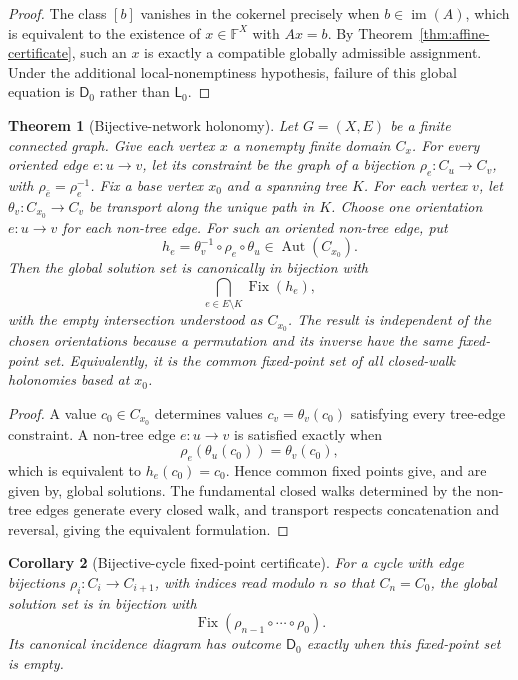 \documentclass[11pt]{article}
\theoremstyle{plain}
\newtheorem{theorem}{Theorem}[section]
\newtheorem{corollary}[theorem]{Corollary}
\theoremstyle{definition}
\theoremstyle{remark}
\begin{document}
\begin{proof}
The class $[b]$ vanishes in the cokernel precisely when
$b\in\operatorname{im}(A)$, which is equivalent to the existence of
$x\in\mathbb F^X$ with $Ax=b$. By Theorem~\ref{thm:affine-certificate}, such an
$x$ is exactly a compatible globally admissible assignment. Under the additional
local-nonemptiness hypothesis, failure of this global equation is
$\mathsf D_0$ rather than $\mathsf L_0$.
\end{proof}

\begin{theorem}[Bijective-network holonomy]
\label{thm:network-holonomy}
Let $G=(X,E)$ be a finite connected graph. Give each vertex $x$ a nonempty
finite domain $C_x$. For every oriented edge $e:u\to v$, let its constraint be
the graph of a bijection $\rho_e:C_u\to C_v$, with
$\rho_{\bar e}=\rho_e^{-1}$. Fix a base vertex $x_0$ and a spanning tree $K$.
For each vertex $v$, let $\theta_v:C_{x_0}\to C_v$ be transport along the
unique path in $K$. Choose one orientation $e:u\to v$ for each non-tree edge. For such an oriented
non-tree edge, put
\[
h_e=\theta_v^{-1}\circ\rho_e\circ\theta_u
\in\operatorname{Aut}(C_{x_0}).
\]
Then the global solution set is canonically in bijection with
\[
\bigcap_{e\in E\setminus K}\operatorname{Fix}(h_e),
\]
with the empty intersection understood as $C_{x_0}$. The result is independent
of the chosen orientations because a permutation and its inverse have the same
fixed-point set. Equivalently, it is the common fixed-point set of all
closed-walk holonomies
based at $x_0$.
\end{theorem}

\begin{proof}
A value $c_0\in C_{x_0}$ determines values
$c_v=\theta_v(c_0)$ satisfying every tree-edge constraint. A non-tree edge
$e:u\to v$ is satisfied exactly when
\[
\rho_e(\theta_u(c_0))=\theta_v(c_0),
\]
which is equivalent to $h_e(c_0)=c_0$. Hence common fixed points give, and are
given by, global solutions. The fundamental closed walks determined by the
non-tree edges generate every closed walk, and transport respects concatenation
and reversal, giving the equivalent formulation.
\end{proof}

\begin{corollary}[Bijective-cycle fixed-point certificate]
\label{cor:cycle-holonomy}
For a cycle with edge bijections
$\rho_i:C_i\to C_{i+1}$, with indices read modulo $n$ so that $C_n=C_0$, the
global solution set is in bijection with
\[
\operatorname{Fix}(\rho_{n-1}\circ\cdots\circ\rho_0).
\]
Its canonical incidence diagram has outcome $\mathsf D_0$ exactly when this
fixed-point set is empty.
\end{corollary}
\end{document}

